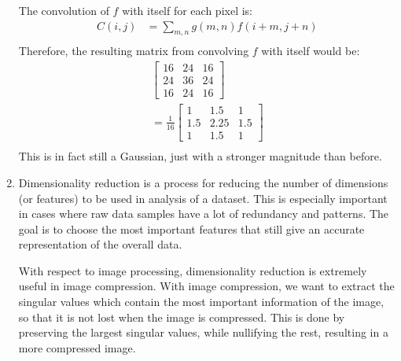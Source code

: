 \documentclass[12pt]{article}
\begin{document}
\begin{enumerate}
	The convolution of $f$ with itself for each pixel is:
	\begin{align*}
		C(i, j) &= \sum_{m, n} g(m, n) f(i + m, j + n) \\
	\end{align*}
	Therefore, the resulting matrix from convolving $f$ with itself would be:
		\begin{align*}
		\begin{bmatrix}  16 & 24 & 16 \\ 24 & 36 & 24 \\ 16 & 24 & 16 \end{bmatrix} \\
		= \frac{1}{16}
		\begin{bmatrix}  1 & 1.5 & 1 \\ 1.5 & 2.25 & 1.5 \\ 1 & 1.5 & 1 \end{bmatrix} \\
	\end{align*}
	This is in fact still a Gaussian, just with a stronger magnitude than before.
	
	\item Dimensionality reduction is a process for reducing the number of dimensions (or features) to be used in analysis of a dataset. This is especially important in cases where raw data samples have a lot of redundancy and patterns. The goal is to choose the most important features that still give an accurate representation of the overall data.
	
	With respect to image processing, dimensionality reduction is extremely useful in image compression. With image compression, we want to extract the singular values which contain the most important information of the image, so that it is not lost when the image is compressed. This is done by preserving the largest singular values, while nullifying the rest, resulting in a more compressed image. 
	

\end{enumerate}
\end{document}
